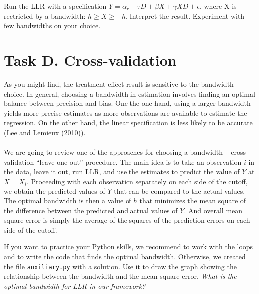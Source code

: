 \begin{boenumerate}

\item Run the LLR with a specification $Y = \alpha_r + \tau D + \beta X + \gamma X D + \epsilon$, where X is rectricted by a bandwidth: $h \geq X \geq -h$. Interpret the result. Experiment with few bandwidths on your choice.

\end{boenumerate}

\section*{Task D. Cross-validation}

As you might find, the treatment effect result is sensitive to the bandwidth choice. In general, choosing a bandwidth in estimation involves finding an optimal balance between precision and bias. One the one hand, using a larger bandwidth yields more precise estimates as more observations are available to estimate the regression. On the other hand, the linear specification is less likely to be accurate (Lee and Lemieux (2010)).\\
\\
We are going to review one of the approaches for choosing a bandwidth --  cross-validation “leave one out” procedure. The main idea is to take an observation $i$ in the data, leave it out, run LLR, and use the estimates to predict the value of $Y$ at $X = X_i$.  Proceeding with each observation separately on each side of the cutoff, we obtain the predicted values of $Y$ that can be compared to the actual values. The optimal bandwidth is then a value of $h$ that minimizes the mean square of the difference between the predicted and actual values of $Y$. And overall mean square error is simply the average of the squares of the prediction errors  on each side of the cutoff.

\begin{boenumerate}

\item If you want to practice your Python skills, we recommend to work with the loops and to write the code that finds the optimal bandwidth. Otherwise, we created the file \texttt{auxiliary.py} with a solution. Use it to draw the graph showing the relationship between the bandwidth and the mean square error. \emph{What is the optimal bandwidth for LLR in our framework?}

\end{boenumerate}

\nocite{CPS}





